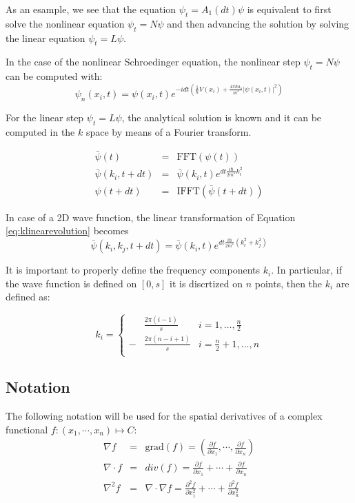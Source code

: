 \documentclass[a4paper,11pt]{article}
\begin{document}
As an esample, we see that the equation $ \psi_t = A_1(dt) \psi $
is equivalent to first solve the nonlinear equation $ \psi_t = N \psi $
and then advancing the solution by solving the linear equation $ \psi_t = L \psi $.

In the case of the nonlinear Schroedinger equation, the nonlinear step $ \psi_t = N \psi $ can be computed with:
$$ \psi_n(x_i, t) = \psi(x_i, t) e^{-i dt \left(\frac{1}{\hbar}V(x_i) + \frac{4 \pi \hbar a_s}{m^*} |\psi(x_i, t)|^2 \right)} $$

For the linear step $ \psi_t = L \psi $, the analytical solution is known and it can be computed in the $k$ space by means of a Fourier transform.

\begin{eqnarray}
 \bar{\psi}(t) &=& \mbox{FFT}(\psi(t)) \\
 \bar{\psi}(k_i, t+dt) &=& \bar{\psi}(k_i, t) e^{dt \frac{i\hbar}{2m^*} k_i^2} \label{eq:klinearevolution} \\
 \psi(t+dt) &=& \mbox{IFFT}(\bar{\psi}(t+dt))
\end{eqnarray}

In case of a 2D wave function, the linear transformation of Equation \ref{eq:klinearevolution} becomes
$$ \bar{\psi}(k_i, k_j, t+dt) = \bar{\psi}(k_i, t)
   e^{dt \frac{i\hbar}{2m^*} (k_i^2 + k_j^2)} \label{eq:klinearevolution} $$

It is important to properly define the frequency components $k_i$.
In particular, if the wave function is defined on $[0, s]$ it is discrtized on $n$ points, then the $k_i$ are defined as:

\begin{equation} k_i = \left\{ \begin{array}{rll}
          &\frac{2 \pi (i-1)}{s} & i = 1, \ldots, \frac{n}{2} \\
          -&\frac{2 \pi (n-i+1)}{s} & i = \frac{n}{2}+1, \ldots, n \\
         \end{array} \right . \end{equation}

\newpage

\begin{appendices}
\section{Notation}

The following notation will be used for the spatial derivatives of a complex functional
$f:(x_1,\cdots, x_n)\mapsto C$:
\begin{eqnarray}
\nabla f &=& \mbox{grad}(f) =
\left( \frac{\partial f}{\partial x_1}, \cdots, \frac{\partial f}{\partial x_n} \right) \\
\nabla \cdot f &=& div(f) = \frac{\partial f}{\partial x_1} + \cdots + \frac{\partial f}{\partial x_n} \\
\nabla^2 f &=& \nabla \cdot \nabla f =
    \frac{\partial^2 f}{\partial x_1^2} + \cdots + \frac{\partial^2 f}{\partial x_n^2}
\end{eqnarray}

\end{appendices}
\end{document}
